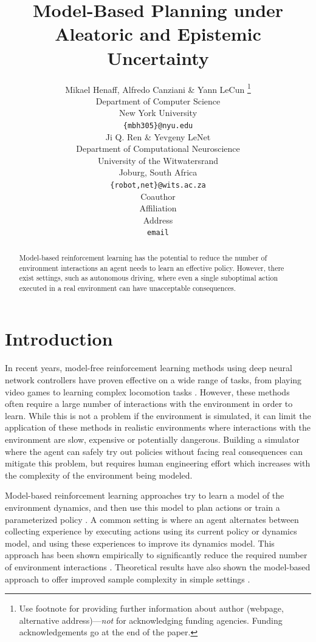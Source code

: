 \documentclass{article} %
\title{Model-Based Planning under Aleatoric and Epistemic Uncertainty}
\author{Mikael Henaff, Alfredo Canziani \& Yann LeCun \thanks{ Use footnote for providing further information
about author (webpage, alternative address)---\emph{not} for acknowledging
funding agencies.  Funding acknowledgements go at the end of the paper.} \\
Department of Computer Science\\
New York University\\
\texttt{\{mbh305\}@nyu.edu} \\
\And
Ji Q. Ren \& Yevgeny LeNet \\
Department of Computational Neuroscience \\
University of the Witwatersrand \\
Joburg, South Africa \\
\texttt{\{robot,net\}@wits.ac.za} \\
\AND
Coauthor \\
Affiliation \\
Address \\
\texttt{email}
}
\begin{document}
\maketitle

\begin{abstract}
  Model-based reinforcement learning has the potential to reduce the number of environment interactions an agent needs to learn an effective policy.
  However, there exist settings, such as autonomous driving, where even a single suboptimal action executed in a real environment can have unacceptable consequences.
\end{abstract}

\section{Introduction}

In recent years, model-free reinforcement learning methods using deep neural network controllers have proven effective on a wide range of tasks, from playing video games \citep{mnih15, A3C} to learning complex locomotion tasks \citep{Lillicrap2015}.
However, these methods often require a large number of interactions with the environment in order to learn.
While this is not a problem if the environment is simulated, it can limit the application of these methods in realistic environments where interactions with the environment are slow, expensive or potentially dangerous.
Building a simulator where the agent can safely try out policies without facing real consequences can mitigate this problem, but requires human engineering effort which increases with the complexity of the environment being modeled.


Model-based reinforcement learning approaches try to learn a model of the environment dynamics, and then use this model to plan actions or train a parameterized policy \citep{Nguyen1990, Schmidhuber1990, Jordan1992}.
A common setting is where an agent alternates between collecting experience by executing actions using its current policy or dynamics model, and using these experiences to improve its dynamics model.
This approach has been shown empirically to significantly reduce the required number of environment interactions \citep{Atkeson1997, PILCO, Nagabandi2017, Chua2018}.
Theoretical results have also shown the model-based approach to offer improved sample complexity in simple settings \citep{LS-LQR, Recht2018}.
\end{document}
